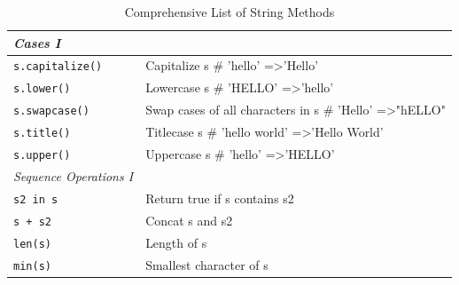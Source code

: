 \documentclass[a4paper,11pt]{book}
\begin{document}
\begin{appendices}
\begin{table}[!htbp]
\centering
\caption{Comprehensive List of String Methods}
\label{tab:string_methods}
\begin{tabular}{lp{11cm}}
\toprule \toprule
\textit{Cases I}          &                                                                                                                                               \\ \midrule
\texttt{s.capitalize()         }  & Capitalize s \# 'hello' =\textgreater 'Hello'                                                                                                   \\
\texttt{s.lower()               } & Lowercase s \# 'HELLO' =\textgreater 'hello'                                                                                                    \\
\texttt{s.swapcase()           }  & Swap cases of all characters in s \# 'Hello' =\textgreater "hELLO"                                                                              \\
\texttt{s.title()              }  & Titlecase s \# 'hello world' =\textgreater 'Hello World'                                                                                        \\
\texttt{s.upper()             }   & Uppercase s \# 'hello' =\textgreater 'HELLO'                                                                                                    \\ \midrule
\textit{Sequence Operations I}    &                                                                                                                                                 \\ \midrule
\texttt{s2 in s              }    & Return true if s contains s2                                                                                                                    \\
\texttt{s + s2                }   & Concat s and s2                                                                                                                                 \\
\texttt{len(s)               }    & Length of s                                                                                                                                     \\
\texttt{min(s)              }     & Smallest character of s                                                                                                                         \\

\end{tabular}
\end{table}
\end{appendices}
\end{document}

